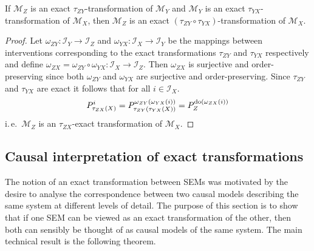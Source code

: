 \medskip

\begin{lemma}\label{theorem:transitivity}
    If $\mathcal{M}_Z$ is an exact $\tau_{ZY}$-transformation of $\mathcal{M}_Y$ and $\mathcal{M}_Y$ is an exact $\tau_{YX}$-transformation of $\mathcal{M}_X$, then $\mathcal{M}_Z$ is an exact $(\tau_{ZY}\circ\tau_{YX})$-transformation of $\mathcal{M}_X$.
\end{lemma}

\begin{proof}
    Let $\omega_{ZY}:\mathcal{I}_Y \to \mathcal{I}_Z$ and $\omega_{YX}:\mathcal{I}_X \to \mathcal{I}_Y$ be the mappings between interventions corresponding to the exact transformations $\tau_{ZY}$ and $\tau_{YX}$ respectively and define $\omega_{ZX} = \omega_{ZY}\circ\omega_{YX}:\mathcal{I}_X \to \mathcal{I}_Z$.
    Then $\omega_{ZX}$ is surjective and order-preserving since both $\omega_{ZY}$ and $\omega_{YX}$ are surjective and order-preserving.
    Since $\tau_{ZY}$ and $\tau_{YX}$ are exact it follows that for all $i\in\mathcal{I}_X$.
    \begin{align*}
        P^{i}_{\tau_{ZX}(X)}
        =
        P^{ \omega_{ZY}(\omega_{YX}(i))}_{\tau_{ZY}(\tau_{YX}(X))}
        =
        P^{\operatorname{do}(\omega_{ZX}(i))}_{Z}
    \end{align*}
    i.\,e.\ $\mathcal{M}_Z$ is an $\tau_{ZX}$-exact transformation of $\mathcal{M}_X$.
\end{proof}



\subsection{Causal interpretation of exact transformations}
The notion of an exact transformation between SEMs was motivated by the desire to analyse the correspondence between two causal models describing the same system at different levels of detail.
The purpose of this section is to show that if one SEM can be viewed as an exact transformation of the other, then both can sensibly be thought of as causal models of the same system. 
The main technical result is the following theorem.

\medskip

